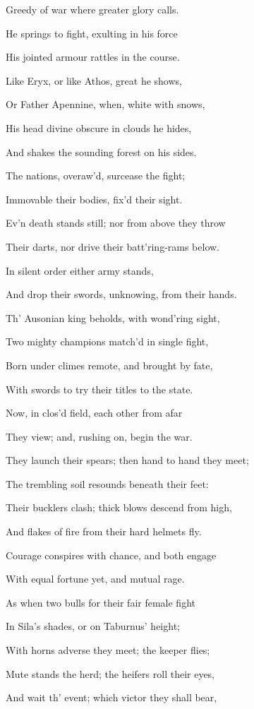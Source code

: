 Greedy of war where greater glory calls.

He springs to fight, exulting in his force

His jointed armour rattles in the course.

Like Eryx, or like Athos, great he shows,

Or Father Apennine, when, white with snows,

His head divine obscure in clouds he hides,

And shakes the sounding forest on his sides.

The nations, overaw’d, surcease the fight;

Immovable their bodies, fix’d their sight.

Ev’n death stands still; nor from above they throw

Their darts, nor drive their batt’ring-rams below.

In silent order either army stands,

And drop their swords, unknowing, from their hands.

Th’ Ausonian king beholds, with wond’ring sight,

Two mighty champions match’d in single fight,

Born under climes remote, and brought by fate,

With swords to try their titles to the state.

Now, in clos’d field, each other from afar

They view; and, rushing on, begin the war.

They launch their spears; then hand to hand they meet;

The trembling soil resounds beneath their feet:

Their bucklers clash; thick blows descend from high,

And flakes of fire from their hard helmets fly.

Courage conspires with chance, and both engage

With equal fortune yet, and mutual rage.

As when two bulls for their fair female fight

In Sila’s shades, or on Taburnus’ height;

With horns adverse they meet; the keeper flies;

Mute stands the herd; the heifers roll their eyes,

And wait th’ event; which victor they shall bear,

